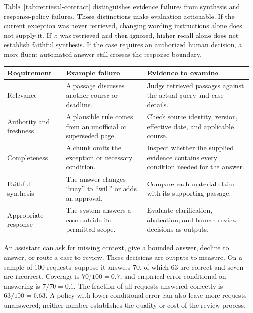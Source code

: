 Table~\ref{tab:retrieval-contract} distinguishes evidence failures from synthesis and response-policy failures. These distinctions make evaluation actionable. If the current exception was never retrieved, changing wording instructions alone does not supply it. If it was retrieved and then ignored, higher recall alone does not establish faithful synthesis. If the case requires an authorized human decision, a more fluent automated answer still crosses the response boundary.

\par\addvspace{\intextsep}\noindent\begin{minipage}{\linewidth}
\centering
\setlength{\tabcolsep}{3pt}
\renewcommand{\arraystretch}{1.12}
\begin{tabular}{@{}>{\raggedright\arraybackslash}p{2.05cm}>{\raggedright\arraybackslash}p{3.65cm}>{\raggedright\arraybackslash}p{4.3cm}@{}}
\toprule
Requirement & Example failure & Evidence to examine \\
\midrule
Relevance & A passage discusses another course or deadline. & Judge retrieved passages against the actual query and case details. \\
Authority and freshness & A plausible rule comes from an unofficial or superseded page. & Check source identity, version, effective date, and applicable course. \\
Completeness & A chunk omits the exception or necessary condition. & Inspect whether the supplied evidence contains every condition needed for the answer. \\
Faithful synthesis & The answer changes ``may'' to ``will'' or adds an approval. & Compare each material claim with its supporting passage. \\
Appropriate response & The system answers a case outside its permitted scope. & Evaluate clarification, abstention, and human-review decisions as outputs. \\
\bottomrule
\end{tabular}
\label{tab:retrieval-contract}\label{tab:nlp-retrieval-failure-modes}\label{tab:hallucination-failure-types}
\end{minipage}\par\addvspace{\intextsep}

An assistant can ask for missing context, give a bounded answer, decline to answer, or route a case to review. These decisions are outputs to measure. On a sample of 100 requests, suppose it answers 70, of which 63 are correct and seven are incorrect. Coverage is $70/100=0.7$, and empirical error conditional on answering is $7/70=0.1$. The fraction of all requests answered correctly is $63/100=0.63$. A policy with lower conditional error can also leave more requests unanswered; neither number establishes the quality or cost of the review process.

